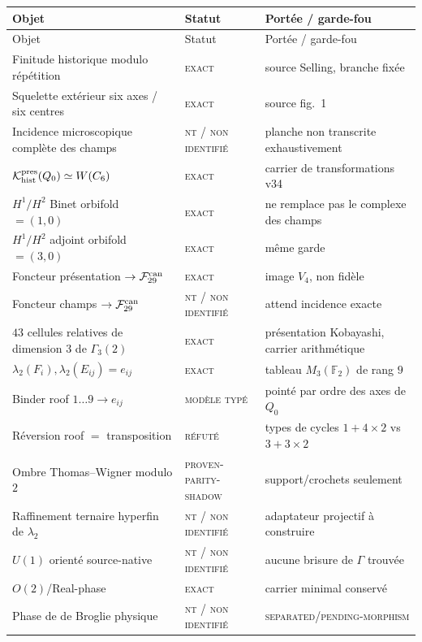 \documentclass[11pt,a4paper]{article}
\newcommand{\statusExact}{\textsc{exact}}
\newcommand{\statusTyped}{\textsc{modèle typé}}
\newcommand{\statusNT}{\textsc{nt / non identifié}}
\begin{document}
\begin{longtable}{p{}p{}p{}}
\toprule
Objet & Statut & Portée / garde-fou\\
\midrule
\endfirsthead
\toprule
Objet & Statut & Portée / garde-fou\\
\midrule
\endhead
Finitude historique modulo répétition & \statusExact & source Selling, branche fixée\\
Squelette extérieur six axes / six centres & \statusExact & source fig.~1\\
Incidence microscopique complète des champs & \statusNT & planche non transcrite exhaustivement\\
$\mathcal K_{\rm hist}^{\rm pres}(Q_0)\simeq W(C_6)$ & \statusExact & carrier de transformations v34\\
$H^1/H^2$ Binet orbifold $=(1,0)$ & \statusExact & ne remplace pas le complexe des champs\\
$H^1/H^2$ adjoint orbifold $=(3,0)$ & \statusExact & même garde\\
Foncteur présentation $\to\mathcal F_{29}^{\rm can}$ & \statusExact & image $V_4$, non fidèle\\
Foncteur champs $\to\mathcal F_{29}^{\rm can}$ & \statusNT & attend incidence exacte\\
$43$ cellules relatives de dimension $3$ de $\Gamma_3(2)$ & \statusExact & présentation Kobayashi, carrier arithmétique\\
$\lambda_2(F_i),\lambda_2(E_{ij})=e_{ij}$ & \statusExact & tableau $M_3(\mathbb F_2)$ de rang $9$\\
Binder roof $1\ldots9\to e_{ij}$ & \statusTyped & pointé par ordre des axes de $Q_0$\\
Réversion roof $=$ transposition & \textsc{réfuté} & types de cycles $1+4\times2$ vs $3+3\times2$\\
Ombre Thomas--Wigner modulo $2$ & \textsc{proven-parity-shadow} & support/crochets seulement\\
Raffinement ternaire hyperfin de $\lambda_2$ & \statusNT & adaptateur projectif à construire\\
$U(1)$ orienté source-native & \statusNT & aucune brisure de $\Gamma$ trouvée\\
$O(2)$/Real-phase & \statusExact & carrier minimal conservé\\
Phase de de Broglie physique & \statusNT & \textsc{separated/pending-morphism}\\
\bottomrule
\end{longtable}
\end{document}
